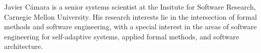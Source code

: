 \documentclass[10pt,journal,compsoc]{IEEEtran}
\begin{document}



%
%
%

% 

\begin{IEEEbiography}{Javier C\'{a}mara}
is a senior systems scientist at the Insitute for Software Research, Carnegie Mellon University. His research interests lie in the intersection of formal methods and software engineering, with a special interest in the areas of software engineering for self-adaptive systems, applied formal methods, and software architecture. 
\end{IEEEbiography}


\end{document}
